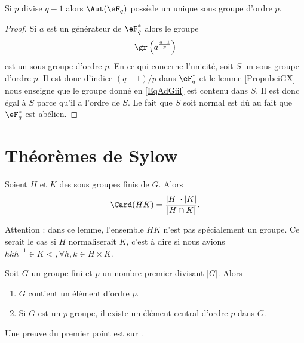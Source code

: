 \begin{corollary}       \label{CorwgmoTK}
    Si \( p\) divise \( q-1\) alors \( \Aut(\eF_q)\) possède un unique sous groupe d'ordre \( p\).
\end{corollary}

\begin{proof}
    Si \( a\) est un générateur de \( \eF_q^*\) alors le groupe
    \begin{equation}    \label{EqAdGiil}
        \gr\left( a^{\frac{ q-1 }{ p }} \right)
    \end{equation}
    est un sous groupe d'ordre \( p\). En ce qui concerne l'unicité, soit \( S\) un sous groupe d'ordre \( p\). Il est donc d'indice \( (q-1)/p\) dans \( \eF_q^*\) et le lemme \ref{PropubeiGX} nous enseigne que le groupe donné en \eqref{EqAdGiil} est contenu dans \( S\). Il est donc égal à \( S\) parce qu'il a l'ordre de \( S\). Le fait que \( S\) soit normal est dû au fait que \( \eF_q^*\) est abélien.
\end{proof}

\section{Théorèmes de Sylow}

\begin{lemma}
    Soient \( H\) et \( K\) des sous groupes finis de \( G\). Alors
    \begin{equation}
        \Card(HK)=\frac{ | H |\cdot | K | }{ | H\cap K | }.
    \end{equation}
\end{lemma} 
Attention : dans ce lemme, l'ensemble \( HK\) n'est pas spécialement un groupe. Ce serait le cas si \( H\) normaliserait \( K\), c'est à dire si nous avions \( hkh^{-1}\in K<,\forall h,k\in H\times K\).

\begin{theorem}       \label{ThoCauchyGpFini}
    Soit \( G\) un groupe fini et \( p\) un nombre premier divisant \( | G |\). Alors 
    \begin{enumerate}
        \item
            \( G\) contient un élément d'ordre \( p\).  
        \item
            Si \( G\) est un \( p\)-groupe, il existe un élément central d'ordre \( p\) dans \( G\).
    \end{enumerate}
\end{theorem}
Une preuve du premier point est sur .

